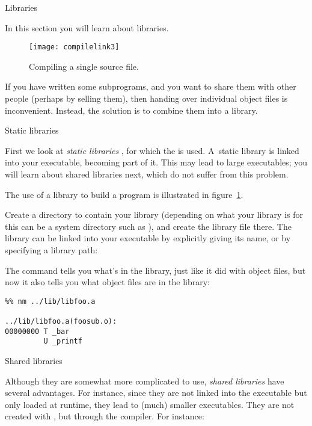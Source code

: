  {Libraries}

\begin{purpose}
  In this section you will learn about libraries.
\end{purpose}

\begin{figure}[ht]
  \texttt{[image: compilelink3]}
  \caption{Compiling a single source file.}
  \label{fig:compilelink3}
\end{figure}

If you have written some subprograms, and you want to share them with
other people (perhaps by selling them), then handing over individual
object files is inconvenient. Instead, the solution is to combine them
into a library.

 {Static libraries}

First we look at
\emph{static libraries}%
,
for
which the   is used. A~static library
is linked into your executable, becoming part of it. This may lead to
large executables; you will learn about shared libraries
next, which do not suffer from this problem.

The use of a library to build a program is illustrated
in figure~\ref{fig:compilelink3}.

Create a directory to contain your library (depending on what your
library is for this can be a
system directory such as ), and create the library file
there. 
The library can be linked into your executable by explicitly giving
its name, or by specifying a library path:



The  command tells you what's in the library, just
like it did with object files, but now it also tells you what object
files are in the library:
\begin{verbatim}
%% nm ../lib/libfoo.a 

../lib/libfoo.a(foosub.o):
00000000 T _bar
         U _printf
\end{verbatim}


 {Shared libraries}

Although they are somewhat more complicated to use, 
\emph{shared libraries}%
have several advantages. For
instance, since they are not linked into the executable but only
loaded at runtime, they lead to (much) smaller executables. They are
not created with , but through the compiler. For instance:


